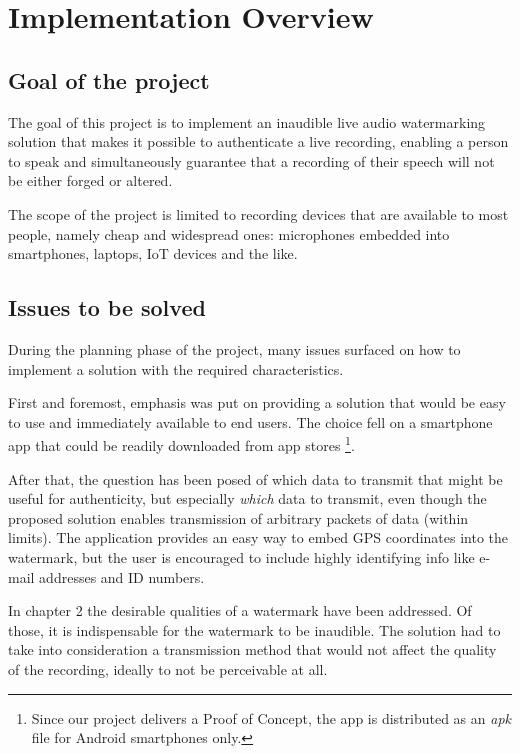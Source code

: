 \chapter{Implementation Overview}
\section{Goal of the project}
The goal of this project is to implement an inaudible live audio watermarking solution that makes it possible to authenticate a live recording, enabling a person to speak and simultaneously guarantee that a recording of their speech will not be either forged or altered. 

The scope of the project is limited to recording devices that are available to most people, namely cheap and widespread ones: microphones embedded into smartphones, laptops, IoT devices and the like.


\section{Issues to be solved}
During the planning phase of the project, many issues surfaced on how to implement a solution with the required characteristics. %



First and foremost, emphasis was put on providing a solution that would be easy to use and immediately available to end users. The choice fell on a smartphone app that could be readily downloaded from app stores \footnote{Since our project delivers a Proof of Concept, the app is distributed as an \emph{apk} file for Android smartphones only.}.



After that, the question has been posed of which data to transmit that might be useful for authenticity, but especially \emph{which} data to transmit, even though the proposed solution enables transmission of arbitrary packets of data (within limits). The application provides an easy way to embed GPS coordinates into the watermark, but the user is encouraged to include highly identifying info like e-mail addresses and ID numbers.




In chapter 2 the desirable qualities of a watermark have been addressed. Of those, it is indispensable for the watermark to be inaudible. The  solution had to take into consideration a transmission method that would not affect the quality of the recording, ideally to not be perceivable at all.

